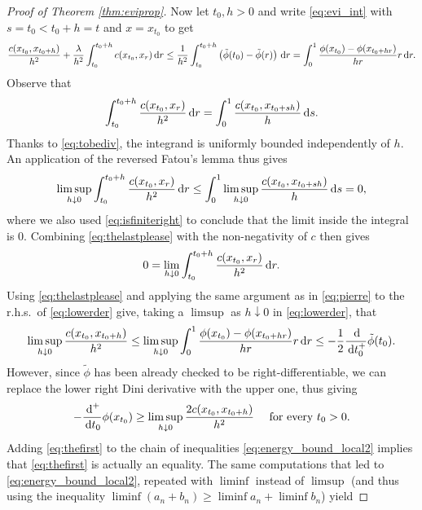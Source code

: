 \documentclass[reqno]{amsart}
\theoremstyle{plain}
\theoremstyle{remark}
\theoremstyle{plain}
\numberwithin{equation}{section}
\theoremstyle{remark}
\newcommand{\de}{{\,\rm d}}
\begin{document}
\begin{proof}[Proof of Theorem \ref{thm:eviprop}]
\medskip
Now let $t_0, h>0$ and write \eqref{eq:evi_int} with $s=t_0 < t_0+h =t$ and $x=x_{t_0}$ to get
\begin{equation}\label{eq:lowerder}
    \frac{c(x_{t_0},x_{t_0+h})}{h^2} + \frac{\lambda}{h^2} \int_{t_0}^{t_0+h} c(x_{t_0}, x_r) \de r
    \le \frac{1}{h^2} \int_{t_0}^{t_0+h} \left (\tilde{\phi}(t_0)-\tilde{\phi}(r) \right) \de r = \int_0^1 \frac{\phi(x_{t_0})-\phi(x_{t_0+hr})}{hr} r\de r.
    \end{equation}
Observe that
\[
\int_{t_0}^{t_0+h} \frac{c(x_{t_0}, x_{r})}{h^2} \de r
= \int_{0}^1 \frac{c(x_{t_0}, x_{t_0+sh})}{h} \de s.
\]
Thanks to \eqref{eq:tobediv}, the integrand is uniformly bounded  independently of $h$.  An application of the reversed Fatou's lemma thus gives
\begin{equation}\label{eq:thelastplease} 
     \limsup_{h \downarrow 0} \int_{t_0}^{t_0+h} \frac{c(x_{t_0}, x_{r})}{h^2} \de r \le \int_0^1 \limsup_{h \downarrow 0} \frac{c(x_{t_0}, x_{t_0+sh})}{h} \de s =0,
\end{equation}
where we  also  used \eqref{eq:isfiniteright} to conclude that the limit inside the integral is $0$. Combining \eqref{eq:thelastplease} with the non-negativity of $c$ then gives
\begin{equation*}
    0=\lim_{h \downarrow 0} \int_{t_0}^{t_0+h} \frac{c(x_{t_0}, x_{r})}{h^2} \de r.
\end{equation*}
Using \eqref{eq:thelastplease} and applying the same argument as in \eqref{eq:pierre} to the r.h.s.\ of \eqref{eq:lowerder} give, taking a $\limsup$ as $h \downarrow 0$ in \eqref{eq:lowerder}, that
    \begin{equation}\label{eq:bound_limsup_lowerDini}
    \limsup_{h \downarrow 0}\frac{c(x_{t_0},x_{t_0+h})}{h^2}
    \le \limsup_{h \downarrow 0} \int_0^1 \frac{\phi(x_{t_0})-\phi(x_{t_0+hr})}{hr} r\de r \le -\frac{1}{2} \frac{\de}{\de t_0^+}\tilde{\phi}(t_0).
    \end{equation}
However, since $\tilde{\phi}$ has been  already checked  to be right-differentiable, we can replace the lower right Dini derivative with the upper one, thus giving 
    \begin{equation}\label{eq:thefirst}
        -\frac{\de^+}{\de t_0}\phi(x_{t_0}) \ge \limsup_{h\downarrow 0}\frac{2c(x_{t_0},x_{t_0+h})}{h^2} \quad \text{ for every } t_0>0.
    \end{equation}
Adding \eqref{eq:thefirst} to the chain of  inequalities  \eqref{eq:energy_bound_local2} implies that \eqref{eq:thefirst} is actually an equality.  The same computations  that led to  \eqref{eq:energy_bound_local2},  repeated with  $\liminf$ instead of $\limsup$ (and thus using the inequality $\liminf (a_n+b_n) \ge \liminf a_n + \liminf b_n$) yield 

\end{proof}
\end{document}
